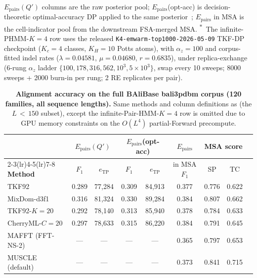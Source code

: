 \documentclass[11pt]{article}
\theoremstyle{definition}
\theoremstyle{remark}
\begin{document}
\begin{table}[t]
{%
$E_{\mathrm{pairs}}(Q')$
columns are the raw posterior pool; $E_{\mathrm{pairs}}$(opt-acc) is
decision-theoretic optimal-accuracy DP applied to the same posterior~\citep{Holmes98};
$E_{\mathrm{pairs}}$ in MSA is the cell-indicator pool from the
downstream FSA-merged MSA.
\textsuperscript{$\ast$}~The infinite-PHMM-$K{=}4$ row uses the
released \texttt{K4-emwarm-top1000-2026-05-09} TKF-DP checkpoint
($K_c{=}4$ classes, $K_H{=}10$ Potts atoms), with $\alpha_z{=}100$
and corpus-fitted indel rates
($\lambda{=}0.04581$, $\mu{=}0.04680$, $r{=}0.6835$),
under replica-exchange (6-rung $\alpha_z$ ladder
$\{100, 178, 316, 562, 10^3, 5{\times}10^3\}$, swap every 10 sweeps;
8000 sweeps + 2000 burn-in per rung; 2 RE replicates per pair).
%
\label{tab:headline-aln}}
\end{table}

\begin{table}[t]
\centering
\footnotesize
\setlength{\tabcolsep}{4pt}
\begin{tabular}{lcccccccc}
\toprule
& \multicolumn{2}{c}{$E_{\mathrm{pairs}}(Q')$} & \multicolumn{2}{c}{$E_{\mathrm{pairs}}$(opt-acc)} & $E_{\mathrm{pairs}}$ & \multicolumn{2}{c}{MSA score} \\
\cmidrule(lr){2-3}\cmidrule(lr){4-5}\cmidrule(lr){7-8}
\textbf{Method} & $F_1$ & $e_{\mathrm{TP}}$ & $F_1$ & $e_{\mathrm{TP}}$ & in MSA $F_1$ & SP & TC \\
\midrule
TKF92                          & 0.289 & 77{,}284 & 0.309 & 84{,}913 & 0.377 & 0.776 & 0.622 \\
MixDom-d3f1                    & 0.316 & 81{,}324 & 0.330 & 89{,}284 & 0.384 & 0.807 & 0.662 \\
TKF92-$K{=}20$                  & 0.292 & 78{,}140 & 0.313 & 85{,}940 & 0.378 & 0.784 & 0.633 \\
CherryML-$C{=}20$               & 0.297 & 78{,}633 & 0.315 & 86{,}220 & 0.384 & 0.791 & 0.645 \\
\midrule
MAFFT (FFT-NS-2)               &   --- &   --- &   --- &   --- & 0.365 & 0.797 & 0.653 \\
MUSCLE (default)               &   --- &   --- &   --- &   --- & 0.373 & 0.841 & 0.715 \\
\bottomrule
\end{tabular}
\caption{\textbf{Alignment accuracy on the full BAliBase bali3pdbm
corpus (120 families, all sequence lengths).} Same methods and
column definitions as  (the $L\,{<}\,150$
subset), except the infinite-Pair-HMM-$K{=}4$ row is omitted
due to GPU memory constraints on the $O(L^4)$ partial-Forward precompute.
\label{tab:headline-aln-full}}
\end{table}
\end{document}
